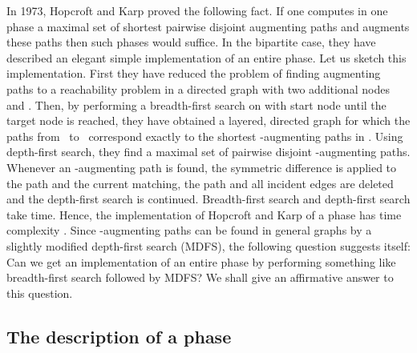 \documentclass[12pt,twoside,a4paper]{article}
\begin{document}
In 1973, Hopcroft and Karp \cite{HK} proved the following fact. If one computes in 
one phase a maximal set of shortest pairwise disjoint augmenting paths
and augments these paths then  such phases would suffice. 
In the bipartite case, they have described an elegant simple  implementation 
of an entire phase. Let us sketch this implementation. First they have reduced 
the problem of finding augmenting paths to a reachability problem in a directed
graph  with two additional nodes  and .
Then, by performing a breadth-first search on  with start node 
until the target node  is reached, they have obtained a layered, directed
graph  for which the paths from~ to~ correspond exactly to
the shortest -augmenting paths in . Using depth-first search, they find a
maximal set of pairwise disjoint -augmenting paths. Whenever an -augmenting path
is found, the symmetric difference is applied to the path and the current matching, 
the path and all incident edges are deleted and the depth-first search is continued. 
Breadth-first search and depth-first search
take  time. Hence, the implementation of Hopcroft and Karp  of a phase has 
time complexity .
Since -augmenting paths can be found in general graphs by a slightly modified 
depth-first search (MDFS), the following question suggests itself:
Can we get an implementation of an entire phase by performing something like
breadth-first search followed by MDFS?
We shall give an affirmative answer to this question.

\subsection{The description of a phase}
\end{document}
